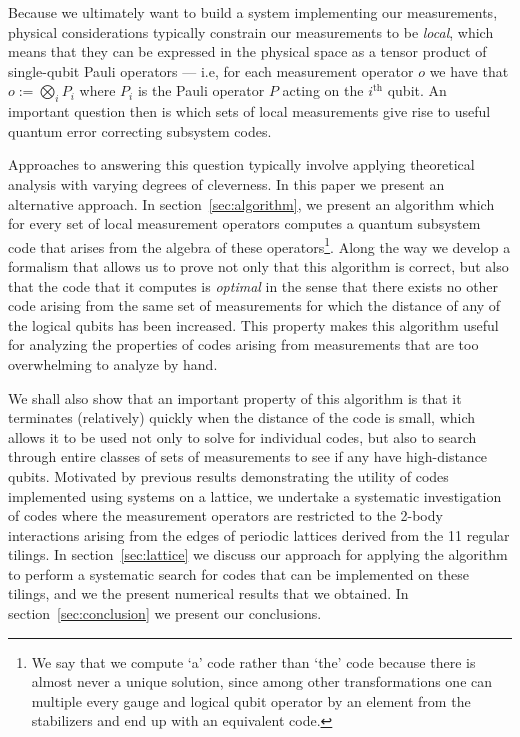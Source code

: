 \documentclass[12pt]{amsbook}
\theoremstyle{plain}
\theoremstyle{definition}
\theoremstyle{remark}
\begin{document}
Because we ultimately want to build a system implementing our measurements, physical considerations typically constrain our measurements to be \emph{local}, which means that they can be expressed in the physical space as a tensor product of single-qubit Pauli operators --- i.e, for each measurement operator $o$ we have that
$o := \bigotimes_i P_i$ where $P_i$ is the Pauli operator $P$ acting on the $i^{\text{th}}$ qubit.  An important question then is which sets of local measurements give rise to useful quantum error correcting subsystem codes.

Approaches to answering this question typically involve applying theoretical analysis with varying degrees of cleverness.  In this paper we present an alternative approach.  In section~\ref{sec:algorithm}, we present an algorithm which for every set of local measurement operators computes a quantum subsystem code that arises from the algebra of these operators\footnote{We say that we compute `a' code rather than `the' code because there is almost never a unique solution, since among other transformations one can multiple every gauge and logical qubit operator by an element from the stabilizers and end up with an equivalent code.}.  Along the way we develop a formalism that allows us to prove not only that this algorithm is correct, but also that the code that it computes is \emph{optimal} in the sense that there exists no other code arising from the same set of measurements for which the distance of any of the logical qubits has been increased.  This property makes this algorithm useful for analyzing the properties of codes arising from measurements that are too overwhelming to analyze by hand.  

We shall also show that an important property of this algorithm is that it terminates (relatively) quickly when the distance of the code is small, which allows it to be used not only to solve for individual codes, but also to search through entire classes of sets of measurements to see if any have high-distance qubits.  Motivated by previous results demonstrating the utility of codes implemented using systems on a lattice, we undertake a systematic investigation of codes where the measurement operators are restricted to the 2-body interactions arising from the edges of periodic lattices derived from the 11 regular tilings.  In section~\ref{sec:lattice} we discuss our approach for applying the algorithm to perform a systematic search for codes that can be implemented on these tilings, and we the present numerical results that we obtained. In section~\ref{sec:conclusion} we present our conclusions.
\end{document}
